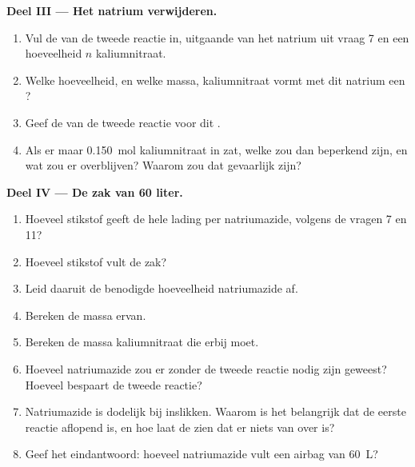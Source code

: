 \begin{problem}
\medskip
\noindent\textbf{Deel III --- Het natrium verwijderen.}
\begin{enumerate}[resume]
  \item Vul de  van de tweede reactie in, uitgaande van
        het natrium uit vraag 7 en een hoeveelheid $n$ kaliumnitraat.
  \item Welke hoeveelheid, en welke massa, kaliumnitraat vormt met dit
        natrium een ?
  \item Geef de  van de tweede reactie voor dit .
  \item Als er maar \qty{0.150}{mol} kaliumnitraat in zat, welke
         zou dan beperkend zijn, en wat zou er overblijven?
        Waarom zou dat gevaarlijk zijn?
\end{enumerate}

\medskip
\noindent\textbf{Deel IV --- De zak van 60 liter.}
\begin{enumerate}[resume]
  \item Hoeveel stikstof geeft de hele lading per  natriumazide,
        volgens de vragen 7 en 11?
  \item Hoeveel stikstof vult de zak?
  \item Leid daaruit de benodigde hoeveelheid natriumazide af.
  \item Bereken de massa ervan.
  \item Bereken de massa kaliumnitraat die erbij moet.
  \item Hoeveel natriumazide zou er zonder de tweede reactie nodig zijn
        geweest? Hoeveel bespaart de tweede reactie?
  \item Natriumazide is dodelijk bij inslikken. Waarom is het belangrijk
        dat de eerste reactie aflopend is, en hoe laat de 
        zien dat er niets van over is?
  \item Geef het eindantwoord: hoeveel natriumazide vult een airbag van
        \qty{60}{L}?
\end{enumerate}
\end{problem}
